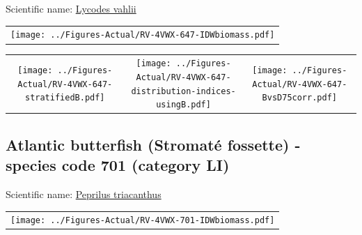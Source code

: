 \documentclass[12pt]{article}\usepackage[]{graphicx}\usepackage[]{color}
\begin{document}
  


Scientific name: \href{http://www.marinespecies.org/aphia.php?p=taxdetails\&id=127118}{Lycodes vahlii} \newline
\begin{minipage}{1.0\textwidth}
 \begin{tabular}{c}
\texttt{[image: ../Figures-Actual/RV-4VWX-647-IDWbiomass.pdf]} \\ 
\end{tabular} 
\end{minipage}
\newline

\vspace{1cm}
\begin{minipage}{1.0\textwidth}
 \begin{tabular}{ccc}
\texttt{[image: ../Figures-Actual/RV-4VWX-647-stratifiedB.pdf]} & 
\texttt{[image: ../Figures-Actual/RV-4VWX-647-distribution-indices-usingB.pdf]} & 
\texttt{[image: ../Figures-Actual/RV-4VWX-647-BvsD75corr.pdf]} \\ 
\end{tabular} 
\end{minipage}
\clearpage

\renewcommand\thefigure{\thesubsection\Alph{figure}}

\setcounter{figure}{0}

\hypertarget{sec:701}{%
\subsection{Atlantic butterfish (Stromaté fossette) - species code 701 (category LI)}\label{sec:701}}

  


Scientific name: \href{http://www.marinespecies.org/aphia.php?p=taxdetails\&id=159828}{Peprilus triacanthus} \newline
\begin{minipage}{1.0\textwidth}
 \begin{tabular}{c}
\texttt{[image: ../Figures-Actual/RV-4VWX-701-IDWbiomass.pdf]} \\ 
\end{tabular} 
\end{minipage}
\newline
\end{document}
